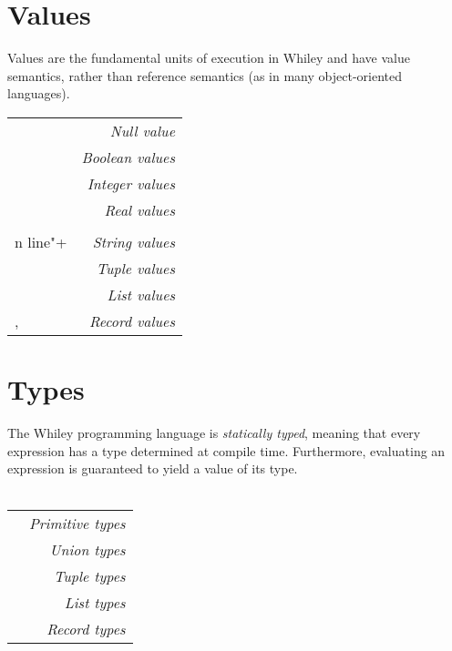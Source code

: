 \documentclass[a4paper,10pt,twcolumn]{article}
\date{}
\newcommand{\token}[1]{\Large\strut\scriptsize\fcolorbox{black}{lightgray}{\strut#1}}
\begin{document}

\section*{Values}
Values are the fundamental units of execution in Whiley and have value semantics, rather than reference semantics (as in many object-oriented languages).

\noindent \begin{tabular}{l r}
\token{\lstinline+null+} & {\em Null value}\\
\token{\lstinline+true+} \token{\lstinline+false+} & {\em Boolean values}\\
\token{\lstinline+123+} \token{\lstinline+-99+} \token{\lstinline+0xFF+} & {\em Integer values}\\
\token{\lstinline+1.23+} \token{\lstinline+-0.02+} & {\em Real values}\\
\token{\lstinline+"Hello"+} \token{\lstinline+"new\\n line"+} & {\em String values}\\
\token{\lstinline+(1,2,3)+} \token{\lstinline+(true,null)+} & {\em Tuple values}\\
\token{\lstinline+[]+} \token{\lstinline+[1,2,3]+} \token{\lstinline+[1,"hello",2.0]+} & {\em List values}\\
\token{\lstinline+\{name: "dave"\}+}, \token{\lstinline+\{x: 1, y: 0\}+} & {\em Record values}\\
\end{tabular}
\section*{Types}
The Whiley programming language is {\em statically typed}, meaning that every expression has a type determined at compile time.  Furthermore, evaluating an expression is guaranteed to yield a value of its type.\\\\ 
\begin{tabular}{l r}
\token{\lstinline+null+} \token{\lstinline+bool+} \token{\lstinline+int+} \token{\lstinline+real+} & {\em Primitive types}\\
\token{\lstinline+int|null+} \token{\lstinline+bool|int|real+} & {\em Union types}\\
\token{\lstinline+(int,int)+} \token{\lstinline+(int,null,bool)+} & {\em Tuple types}\\
\token{\lstinline+[int]+} \token{\lstinline+[[bool]]+} \token{\lstinline+[int|null]+} & {\em List types}\\
\token{\lstinline+\{bool f\}+} \token{\lstinline+\{int len, [int] is\}+} & {\em Record types}\\
\end{tabular}
\end{document}
